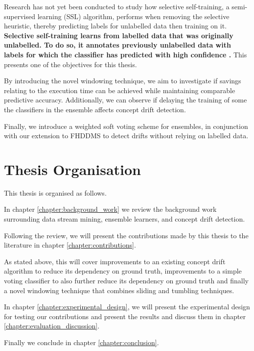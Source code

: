Research has not yet been conducted to study how selective self-training, a semi-supervised learning (SSL) algorithm, performs when removing the selective heuristic, thereby predicting labels for unlabelled data then training on it. \textbf{Selective self-training learns from labelled data that was originally unlabelled. To do so, it annotates previously unlabelled data with labels for which the classifier has predicted with high confidence \cite{zhu2009selftraining}.} This presents one of the objectives for this thesis.

By introducing the novel windowing technique, we aim to investigate if savings relating to the execution time can be achieved while maintaining comparable predictive accuracy. Additionally, we can observe if delaying the training of some the classifiers in the ensemble affects concept drift detection.

Finally, we introduce a weighted soft voting scheme for ensembles, in conjunction with our extension to FHDDMS to detect drifts without relying on labelled data.


\section{Thesis Organisation}
This thesis is organised as follows.

In chapter \ref{chapter:background_work} we review the background work surrounding data stream mining, ensemble learners, and concept drift detection.

Following the review, we will present the contributions made by this thesis to the literature in chapter \ref{chapter:contributions}.

As stated above, this will cover improvements to an existing concept drift algorithm to reduce its dependency on ground truth, improvements to a simple voting classifier to also further reduce its dependency on ground truth and finally a novel windowing technique that combines sliding and tumbling techniques.

In chapter \ref{chapter:experimental_design}, we will present the experimental design for testing our contributions and present the results and discuss them in chapter \ref{chapter:evaluation_discussion}.

Finally we conclude in chapter \ref{chapter:conclusion}.